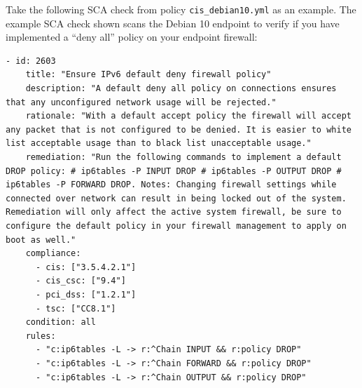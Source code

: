 Take the following SCA check from policy \texttt{cis\_debian10.yml} as an example. The example SCA check shown scans the Debian 10 endpoint to verify if you have implemented a “deny all” policy on your endpoint firewall:
\begin{verbatim}
- id: 2603
    title: "Ensure IPv6 default deny firewall policy"
    description: "A default deny all policy on connections ensures that any unconfigured network usage will be rejected."
    rationale: "With a default accept policy the firewall will accept any packet that is not configured to be denied. It is easier to white list acceptable usage than to black list unacceptable usage."
    remediation: "Run the following commands to implement a default DROP policy: # ip6tables -P INPUT DROP # ip6tables -P OUTPUT DROP # ip6tables -P FORWARD DROP. Notes: Changing firewall settings while connected over network can result in being locked out of the system. Remediation will only affect the active system firewall, be sure to configure the default policy in your firewall management to apply on boot as well."
    compliance:
      - cis: ["3.5.4.2.1"]
      - cis_csc: ["9.4"]
      - pci_dss: ["1.2.1"]
      - tsc: ["CC8.1"]
    condition: all
    rules:
      - "c:ip6tables -L -> r:^Chain INPUT && r:policy DROP"
      - "c:ip6tables -L -> r:^Chain FORWARD && r:policy DROP"
      - "c:ip6tables -L -> r:^Chain OUTPUT && r:policy DROP"
\end{verbatim}

